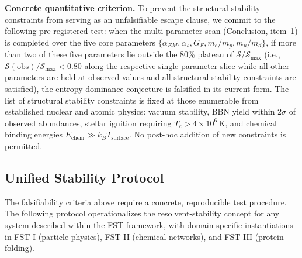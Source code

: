 \documentclass[12pt,a4paper]{article}
\theoremstyle{remark}
\begin{document}
\textbf{Concrete quantitative criterion.} To prevent the structural stability constraints from serving as an unfalsifiable escape clause, we commit to the following pre-registered test: when the multi-parameter scan (Conclusion, item~1) is completed over the five core parameters $\{\alpha_{EM}, \alpha_s, G_F, m_e/m_p, m_u/m_d\}$, if more than two of these five parameters lie outside the 80\% plateau of $\mathcal{S}/\mathcal{S}_{\max}$ (i.e., $\mathcal{S}(\text{obs})/\mathcal{S}_{\max} < 0.80$ along the respective single-parameter slice while all other parameters are held at observed values and all structural stability constraints are satisfied), the entropy-dominance conjecture is falsified in its current form. The list of structural stability constraints is fixed at those enumerable from established nuclear and atomic physics: vacuum stability, BBN yield within $2\sigma$ of observed abundances, stellar ignition requiring $T_c > 4 \times 10^6\,$K, and chemical binding energies $E_{\text{chem}} \gg k_B T_{\text{surface}}$. No post-hoc addition of new constraints is permitted.

\subsection{Unified Stability Protocol}\label{sec:stability-protocol}

The falsifiability criteria above require a concrete, reproducible test procedure.
The following protocol operationalizes the resolvent-stability concept for
any system described within the FST framework, with domain-specific
instantiations in FST-I (particle physics), FST-II (chemical networks),
and FST-III (protein folding).
\end{document}
